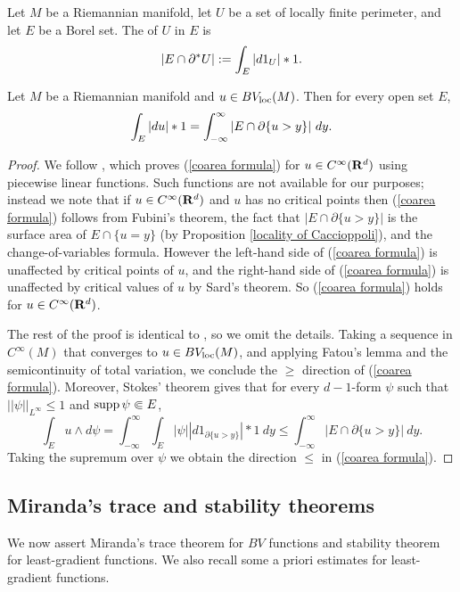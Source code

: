 \begin{definition}
Let $M$ be a Riemannian manifold, let $U$ be a set of locally finite perimeter, and let $E$ be a Borel set.
The  of $U$ in $E$ is
$$|E \cap \partial^* U| := \int_E |d1_U|*1.$$
\end{definition}

\begin{proposition}\label{Coarea2}
Let $M$ be a Riemannian manifold and $u \in BV_{\mathrm{loc}}(M)$. Then for every open set $E$,
\begin{equation}\label{coarea formula}
\int_E |du|*1 = \int_{-\infty}^\infty |E \cap \partial \{u > y\}| ~dy.
\end{equation}
\end{proposition}
\begin{proof}
We follow \cite[Theorem 1.23]{Giusti77}, which proves (\ref{coarea formula}) for $u \in C^\infty(\mathbf{R}^d)$ using piecewise linear functions.
Such functions are not available for our purposes; instead we note that if $u \in C^\infty(\mathbf{R}^d)$ and $u$ has no critical points then (\ref{coarea formula}) follows from Fubini's theorem, the fact that $|E \cap \partial \{u > y\}|$ is the surface area of $E \cap \{u = y\}$ (by Proposition \ref{locality of Caccioppoli}), and the change-of-variables formula.
However the left-hand side of (\ref{coarea formula}) is unaffected by critical points of $u$, and the right-hand side of (\ref{coarea formula}) is unaffected by critical values of $u$ by Sard's theorem.
So (\ref{coarea formula}) holds for $u \in C^\infty(\mathbf{R}^d)$.

The rest of the proof is identical to \cite[Theorem 1.23]{Giusti77}, so we omit the details.
Taking a sequence in $C^\infty(M)$ that converges to $u \in BV_{\mathrm{loc}}(M)$, and applying Fatou's lemma and the semicontinuity of total variation, we conclude the $\geq$ direction of (\ref{coarea formula}).
Moreover, Stokes' theorem gives that for every $d-1$-form $\psi$ such that $||\psi||_{L^\infty} \leq 1$ and $\operatorname{supp} \psi \Subset E$,
$$\int_E u \wedge d\psi = \int_{-\infty}^\infty \int_E |\psi||d1_{\partial \{u > y\}}|*1 ~dy \leq \int_{-\infty}^\infty |E \cap \partial \{u > y\}| ~dy.$$
Taking the supremum over $\psi$ we obtain the direction $\leq$ in (\ref{coarea formula}).
\end{proof}

\subsection{Miranda's trace and stability theorems}
We now assert Miranda's trace theorem for $BV$ functions and stability theorem for least-gradient functions.
We also recall some a priori estimates for least-gradient functions.


